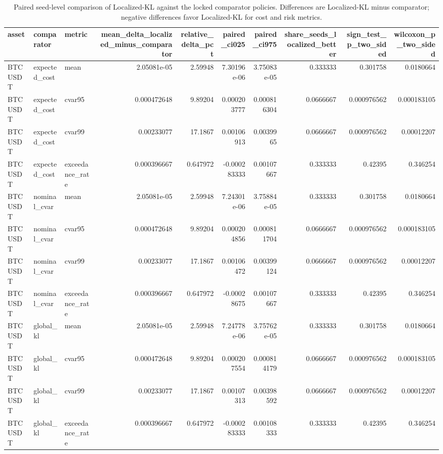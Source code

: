\begin{table}[!htbp]
\centering
\caption{Paired seed-level comparison of Localized-KL against the locked comparator policies. Differences are Localized-KL minus comparator; negative differences favor Localized-KL for cost and risk metrics.}
\label{tab:i7_paired_inference}
\small
\begin{tabular}{lllrrrrrrr}
\toprule
asset & comparator & metric & mean\_delta\_localized\_minus\_comparator & relative\_delta\_pct & paired\_ci025 & paired\_ci975 & share\_seeds\_localized\_better & sign\_test\_p\_two\_sided & wilcoxon\_p\_two\_sided \\
\midrule
BTCUSDT & expected\_cost & mean & 2.05081e-05 & 2.59948 & 7.30196e-06 & 3.75083e-05 & 0.333333 & 0.301758 & 0.0180664 \\
BTCUSDT & expected\_cost & cvar95 & 0.000472648 & 9.89204 & 0.000203777 & 0.000816304 & 0.0666667 & 0.000976562 & 0.000183105 \\
BTCUSDT & expected\_cost & cvar99 & 0.00233077 & 17.1867 & 0.00106913 & 0.0039965 & 0.0666667 & 0.000976562 & 0.00012207 \\
BTCUSDT & expected\_cost & exceedance\_rate & 0.000396667 & 0.647972 & -0.000283333 & 0.00107667 & 0.333333 & 0.42395 & 0.346254 \\
BTCUSDT & nominal\_cvar & mean & 2.05081e-05 & 2.59948 & 7.24301e-06 & 3.75884e-05 & 0.333333 & 0.301758 & 0.0180664 \\
BTCUSDT & nominal\_cvar & cvar95 & 0.000472648 & 9.89204 & 0.000204856 & 0.000811704 & 0.0666667 & 0.000976562 & 0.000183105 \\
BTCUSDT & nominal\_cvar & cvar99 & 0.00233077 & 17.1867 & 0.00106472 & 0.00399124 & 0.0666667 & 0.000976562 & 0.00012207 \\
BTCUSDT & nominal\_cvar & exceedance\_rate & 0.000396667 & 0.647972 & -0.00028675 & 0.00107667 & 0.333333 & 0.42395 & 0.346254 \\
BTCUSDT & global\_kl & mean & 2.05081e-05 & 2.59948 & 7.24778e-06 & 3.75762e-05 & 0.333333 & 0.301758 & 0.0180664 \\
BTCUSDT & global\_kl & cvar95 & 0.000472648 & 9.89204 & 0.000207554 & 0.000814179 & 0.0666667 & 0.000976562 & 0.000183105 \\
BTCUSDT & global\_kl & cvar99 & 0.00233077 & 17.1867 & 0.00107313 & 0.00398592 & 0.0666667 & 0.000976562 & 0.00012207 \\
BTCUSDT & global\_kl & exceedance\_rate & 0.000396667 & 0.647972 & -0.000283333 & 0.00108333 & 0.333333 & 0.42395 & 0.346254 \\

\end{tabular}
\end{table}
